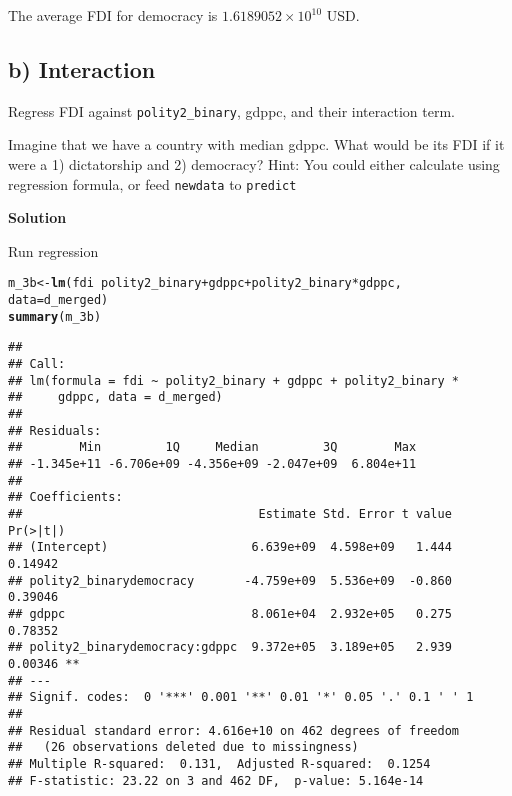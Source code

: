 \documentclass{article}\usepackage[]{graphicx}\usepackage[]{color}
\makeatletter
\newcommand{\hlopt}[1]{\textcolor[rgb]{0,0,0}{#1}}%
\newcommand{\hlstd}[1]{\textcolor[rgb]{0.345,0.345,0.345}{#1}}%
\newcommand{\hlkwb}[1]{\textcolor[rgb]{0.69,0.353,0.396}{#1}}%
\newcommand{\hlkwc}[1]{\textcolor[rgb]{0.333,0.667,0.333}{#1}}%
\newcommand{\hlkwd}[1]{\textcolor[rgb]{0.737,0.353,0.396}{\textbf{#1}}}%
\newenvironment{kframe}{%
 \def\at@end@of@kframe{}%
 \ifinner\ifhmode%
  \def\at@end@of@kframe{\end{minipage}}%
  \begin{minipage}{\columnwidth}%
 \fi\fi%
 \def\FrameCommand##1{\hskip\@totalleftmargin \hskip-\fboxsep
 \colorbox{shadecolor}{##1}\hskip-\fboxsep
     \hskip-\linewidth \hskip-\@totalleftmargin \hskip\columnwidth}%
 \MakeFramed {\advance\hsize-\width
   \@totalleftmargin\z@ \linewidth\hsize
   \@setminipage}}%
 {\par\unskip\endMakeFramed%
 \at@end@of@kframe}
\newenvironment{knitrout}{}{} %
\makeatother
\begin{document}
The average FDI for democracy is \ensuremath{1.6189052\times 10^{10}} USD.

\subsection*{b) Interaction}

Regress FDI against \verb`polity2_binary`, gdppc, and their interaction term.

Imagine that we have a country with median gdppc. What would be its FDI if it were a 1) dictatorship and 2) democracy? Hint: You could either calculate using regression formula, or feed \verb`newdata` to \verb`predict`

\textbf{Solution}

Run regression
\begin{knitrout}
\color{fgcolor}\begin{kframe}
\begin{alltt}
\hlstd{m_3b} \hlkwb{<-} \hlkwd{lm}\hlstd{(fdi} \hlopt{~} \hlstd{polity2_binary} \hlopt{+} \hlstd{gdppc} \hlopt{+} \hlstd{polity2_binary} \hlopt{*} \hlstd{gdppc,}
           \hlkwc{data} \hlstd{= d_merged)}
\hlkwd{summary}\hlstd{(m_3b)}
\end{alltt}
\begin{verbatim}
## 
## Call:
## lm(formula = fdi ~ polity2_binary + gdppc + polity2_binary * 
##     gdppc, data = d_merged)
## 
## Residuals:
##        Min         1Q     Median         3Q        Max 
## -1.345e+11 -6.706e+09 -4.356e+09 -2.047e+09  6.804e+11 
## 
## Coefficients:
##                                 Estimate Std. Error t value Pr(>|t|)   
## (Intercept)                    6.639e+09  4.598e+09   1.444  0.14942   
## polity2_binarydemocracy       -4.759e+09  5.536e+09  -0.860  0.39046   
## gdppc                          8.061e+04  2.932e+05   0.275  0.78352   
## polity2_binarydemocracy:gdppc  9.372e+05  3.189e+05   2.939  0.00346 **
## ---
## Signif. codes:  0 '***' 0.001 '**' 0.01 '*' 0.05 '.' 0.1 ' ' 1
## 
## Residual standard error: 4.616e+10 on 462 degrees of freedom
##   (26 observations deleted due to missingness)
## Multiple R-squared:  0.131,	Adjusted R-squared:  0.1254 
## F-statistic: 23.22 on 3 and 462 DF,  p-value: 5.164e-14
\end{verbatim}
\end{kframe}
\end{knitrout}
\end{document}
